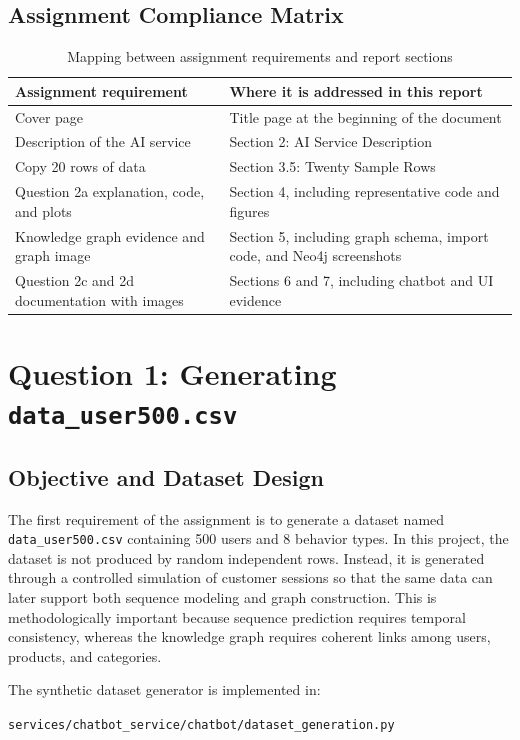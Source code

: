 \documentclass[12pt,a4paper]{article}
\begin{document}
\subsection{Assignment Compliance Matrix}
\begin{table}[H]
\centering
\caption{Mapping between assignment requirements and report sections}
\begin{tabularx}{\linewidth}{>{\raggedright\arraybackslash}p{5cm} >{\raggedright\arraybackslash}X}
\toprule
Assignment requirement & Where it is addressed in this report \\
\midrule
Cover page & Title page at the beginning of the document \\
Description of the AI service & Section 2: AI Service Description \\
Copy 20 rows of data & Section 3.5: Twenty Sample Rows \\
Question 2a explanation, code, and plots & Section 4, including representative code and figures \\
Knowledge graph evidence and graph image & Section 5, including graph schema, import code, and Neo4j screenshots \\
Question 2c and 2d documentation with images & Sections 6 and 7, including chatbot and UI evidence \\
\bottomrule
\end{tabularx}
\end{table}

\clearpage
\section{Question 1: Generating \texttt{data\_user500.csv}}

\subsection{Objective and Dataset Design}
The first requirement of the assignment is to generate a dataset named \texttt{data\_user500.csv} containing 500 users and 8 behavior types. In this project, the dataset is not produced by random independent rows. Instead, it is generated through a controlled simulation of customer sessions so that the same data can later support both sequence modeling and graph construction. This is methodologically important because sequence prediction requires temporal consistency, whereas the knowledge graph requires coherent links among users, products, and categories.

The synthetic dataset generator is implemented in:
\begin{center}
\texttt{services/chatbot\_service/chatbot/dataset\_generation.py}
\end{center}
\end{document}
